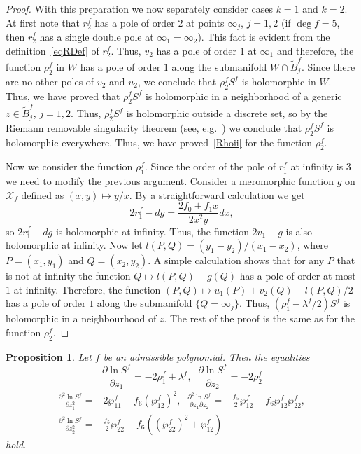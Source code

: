 \documentclass{amsart}
\numberwithin{equation}{section}
\newtheorem{proposition}[theorem]{Proposition}
\theoremstyle{definition}
\theoremstyle{remark}
\begin{document}
\begin{proof}
		With this preparation we now separately consider cases $k = 1$ and $k = 2$. At first note that $r_2^f$ has a pole of order $2$ at points $\infty_j$, $j = 1,2$ (if $\deg f = 5$, then $r_2^f$ has a single double pole at $\infty_1 = \infty_2$). This fact is evident from the definition~\eqref{eqRDef} of $r_2^f$. Thus, $v_2$ has a pole of order $1$ at $\infty_1$ and therefore, the function $\rho_2^f$ in $W$ has a pole of order $1$ along the submanifold $W \cap \tilde B_j^f$. Since there are no other poles of $v_2$ and $u_2$, we conclude that $\rho_2^fS^f$ is holomorphic in $W$. Thus, we have proved that $\rho_2^fS^f$ is holomorphic in a neighborhood of a generic $z \in \tilde{B}_j^f$, $j = 1,2$. Thus, $\rho_2^fS^f$ is holomorphic outside a discrete set, so by the Riemann removable singularity theorem (see, e.g.~\cite[Theorem~7.1.2]{Grauert}) we conclude that $\rho_2^f S^f$ is holomorphic everywhere. Thus, we have proved~\ref{Rhoii} for the function $\rho_2^f$.
		
		Now we consider the function $\rho_1^f$. Since the order of the pole of $r_1^f$ at infinity is $3$ we need to modify the previous argument. Consider a meromorphic function $g$ on $\mathcal X_f$ defined as $(x,y) \mapsto y/x$. By a straightforward calculation we get
		\[
		2r_1^f - dg = \frac{2f_0 + f_1x}{2x^2y}dx,            
		\]
		so $2r^f_1 - dg$ is holomorphic at infinity. Thus, the function $2v_1 - g$ is also holomorphic at infinity. Now let $l(P,Q) = (y_1 - y_2)/(x_1 - x_2)$, where $P = (x_1,y_1)$ and $Q = (x_2,y_2)$. A simple calculation shows that for any $P$ that is not at infinity the function $Q \mapsto l(P,Q) - g(Q)$ has a pole of order at most $1$ at infinity. Therefore, the function $(P,Q) \mapsto u_1(P) + v_2(Q) - l(P,Q)/2$ has a pole of order $1$ along the submanifold $\{Q = \infty_j\}$. Thus, $(\rho_1^f - \lambda^f/2)S^f$ is holomorphic in a neighbourhood of $z$. The rest of the proof is the same as for the function $\rho_2^f$.
	\end{proof}
	\begin{proposition}\label{propDiffS}
		Let $f$ be an admissible polynomial. Then the equalities
		\begin{equation}\label{eq1DiffS}
			\frac{\partial \ln S^f}{\partial z_1} = -2\rho_1^f + \lambda^f,\;\;\frac{\partial \ln S^f}{\partial z_2} = -2\rho_2^f
		\end{equation}
		\begin{equation}\label{eq2DiffS}
			\begin{gathered}
				\frac{\partial^2 \ln S^f}{\partial z_1^2} = -2\wp^f_{11} - f_6 \left(\wp_{12}^f\right)^2,\;\;\frac{\partial^2 \ln S^f}{\partial z_1 \partial z_2} = - \frac{f_5}{2}\wp_{12}^f - f_6\wp_{12}^f\wp_{22}^f,\\ \frac{\partial^2 \ln S^f}{\partial z_2^2} = - \frac{f_5}{2}\wp_{22}^f - f_6\left(\left(\wp_{22}^f\right)^2 + \wp_{12}^f\right)
			\end{gathered}
		\end{equation}
		hold.
	\end{proposition}
\end{document}

